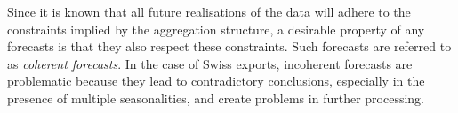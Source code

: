 \documentclass[a4paper,fleqn,11pt]{article}
\begin{document}

Since it is known that all future realisations of the data will adhere to the constraints implied by the aggregation structure, a desirable property of any forecasts is that they also respect these constraints.  Such forecasts are referred to as {\em coherent forecasts}.  In the case of Swiss exports, incoherent forecasts are problematic because they lead to contradictory conclusions, especially in the presence of multiple seasonalities, and create problems in further processing.  
\end{document}
